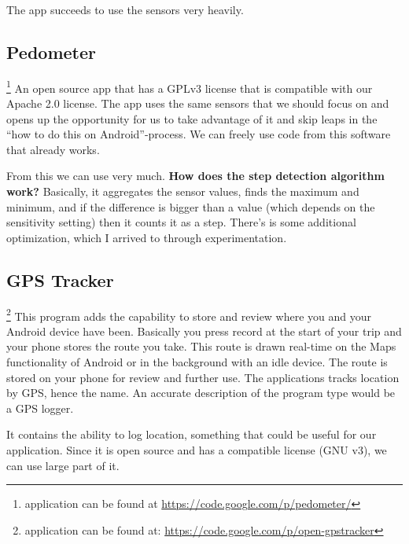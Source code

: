 The app succeeds to use the sensors very heavily.

\subsection{Pedometer}\footnote{application can be found at \url{https://code.google.com/p/pedometer/}} 
An open source app that has a GPLv3 license that is compatible with our Apache 2.0 license. The app uses the same sensors that we should focus on and opens up the opportunity for us to take advantage of it and skip leaps in the “how to do this on Android”-process. We can freely use code from this software that already works.

From this we can use very much.
\textbf{How does the step detection algorithm work?}
Basically, it aggregates the sensor values, finds the maximum and minimum, and if the difference is bigger than a value (which depends on the sensitivity setting) then it counts it as a step. There's is some additional optimization, which I arrived to through experimentation.

\subsection{GPS Tracker}\footnote{application can be found at: \url{https://code.google.com/p/open-gpstracker}}
This program adds the capability to store and review where you and your Android device have been. Basically you press record at the start of your trip and your phone stores the route you take. This route is drawn real-time on the Maps functionality of Android or in the background with an idle device. The route is stored on your phone for review and further use. The applications tracks location by GPS, hence the name. An accurate description of the program type would be a GPS logger.

It contains the ability to log location, something that could be useful for our application. Since it is open source and has a compatible license (GNU v3), we can use large part of it.


